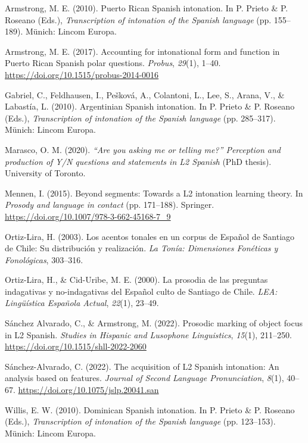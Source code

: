 \documentclass[]{article}
\newlength{\cslhangindent}
\newenvironment{CSLReferences}[2] %
 {%
  \setlength{\parindent}{0pt}
  \ifodd #1 \everypar{\setlength{\hangindent}{\cslhangindent}}\ignorespaces\fi
  \ifnum #2 > 0
  \setlength{\parskip}{#2\baselineskip}
  \fi
 }%
 {}
\begin{document}
\hypertarget{refs}{}
\begin{CSLReferences}{1}{0}
\leavevmode{}%
Armstrong, M. E. (2010). Puerto {R}ican {S}panish intonation. In P. Prieto \& P. Roseano (Eds.), \emph{Transcription of intonation of the {S}panish language} (pp. 155--189). Münich: Lincom Europa.

\leavevmode{}%
Armstrong, M. E. (2017). Accounting for intonational form and function in {P}uerto {R}ican {S}panish polar questions. \emph{Probus}, \emph{29}(1), 1--40. \url{https://doi.org/10.1515/probus-2014-0016}

\leavevmode{}%
Gabriel, C., Feldhausen, I., Pešková, A., Colantoni, L., Lee, S., Arana, V., \& Labastía, L. (2010). {A}rgentinian {S}panish intonation. In P. Prieto \& P. Roseano (Eds.), \emph{Transcription of intonation of the {S}panish language} (pp. 285--317). Münich: Lincom Europa.

\leavevmode{}%
Marasco, O. M. (2020). \emph{{``Are you asking me or telling me?''} {P}erception and production of {Y/N} questions and statements in {L}2 {S}panish} (PhD thesis). University of Toronto.

\leavevmode{}%
Mennen, I. (2015). Beyond segments: {T}owards a {L}2 intonation learning theory. In \emph{Prosody and language in contact} (pp. 171--188). Springer. \url{https://doi.org/10.1007/978-3-662-45168-7_9}

\leavevmode{}%
Ortiz-Lira, H. (2003). Los acentos tonales en un corpus de {E}spañol de {Santiago de Chile}: Su distribución y realización. \emph{La Tonía: Dimensiones Fonéticas y Fonológicas}, 303--316.

\leavevmode{}%
Ortiz-Lira, H., \& Cid-Uribe, M. E. (2000). La prosodia de las preguntas indagativas y no-indagativas del {E}spañol culto de {S}antiago de {C}hile. \emph{LEA: Lingüística {E}spañola {A}ctual}, \emph{22}(1), 23--49.

\leavevmode{}%
Sánchez Alvarado, C., \& Armstrong, M. (2022). Prosodic marking of object focus in {L}2 {S}panish. \emph{Studies in Hispanic and Lusophone Linguistics}, \emph{15}(1), 211--250. \url{https://doi.org/10.1515/shll-2022-2060}

\leavevmode{}%
Sánchez-Alvarado, C. (2022). The acquisition of {L}2 {S}panish intonation: {A}n analysis based on features. \emph{Journal of Second Language Pronunciation}, \emph{8}(1), 40--67. \url{https://doi.org/10.1075/jslp.20041.san}

\leavevmode{}%
Willis, E. W. (2010). {D}ominican {S}panish intonation. In P. Prieto \& P. Roseano (Eds.), \emph{Transcription of intonation of the {S}panish language} (pp. 123--153). Münich: Lincom Europa.

\end{CSLReferences}
\end{document}
